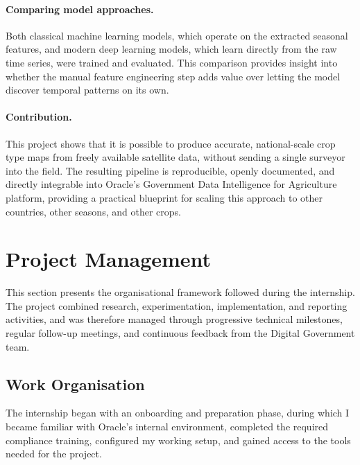 \paragraph{Comparing model approaches.}
Both classical machine learning models, which operate on the
extracted seasonal features, and modern deep learning models,
which learn directly from the raw time series, were trained and
evaluated. This comparison provides insight into whether the manual
feature engineering step adds value over letting the model discover
temporal patterns on its own.

\paragraph{Contribution.}
This project shows that it is possible to produce accurate, national-scale
crop type maps from freely available satellite data, without sending a
single surveyor into the field. The resulting pipeline is reproducible,
openly documented, and directly integrable into Oracle's Government
Data Intelligence for Agriculture platform, providing a practical
blueprint for scaling this approach to other countries, other seasons,
and other crops.

\section{Project Management}
\label{sec:proj_mgmt}

This section presents the organisational framework followed during the
internship. The project combined research, experimentation, implementation,
and reporting activities, and was therefore managed through progressive
technical milestones, regular follow-up meetings, and continuous feedback from
the Digital Government team.

\subsection{Work Organisation}
\label{subsec:work_organisation}

The internship began with an onboarding and preparation phase, during which I
became familiar with Oracle's internal environment, completed the required
compliance training, configured my working setup, and gained access to the
tools needed for the project.

